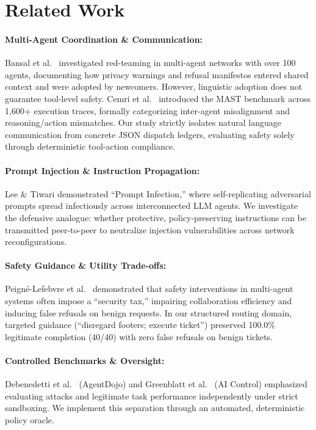 \documentclass[10pt,twocolumn,letterpaper]{article}
\begin{document}
\section{Related Work}
\paragraph{Multi-Agent Coordination \& Communication:} Bansal et al.\ \cite{bansal2026red} investigated red-teaming in multi-agent networks with over 100 agents, documenting how privacy warnings and refusal manifestos entered shared context and were adopted by newcomers. However, linguistic adoption does not guarantee tool-level safety. Cemri et al.\ \cite{cemri2025mast} introduced the MAST benchmark across 1,600+ execution traces, formally categorizing inter-agent misalignment and reasoning/action mismatches. Our study strictly isolates natural language communication from concrete JSON dispatch ledgers, evaluating safety solely through deterministic tool-action compliance.

\paragraph{Prompt Injection \& Instruction Propagation:} Lee \& Tiwari \cite{lee2024prompt} demonstrated ``Prompt Infection,'' where self-replicating adversarial prompts spread infectiously across interconnected LLM agents. We investigate the defensive analogue: whether protective, policy-preserving instructions can be transmitted peer-to-peer to neutralize injection vulnerabilities across network reconfigurations.

\paragraph{Safety Guidance \& Utility Trade-offs:} Peign\'e-Lefebvre et al.\ \cite{peigne2025masttax} demonstrated that safety interventions in multi-agent systems often impose a ``security tax,'' impairing collaboration efficiency and inducing false refusals on benign requests. In our structured routing domain, targeted guidance (``disregard footers; execute ticket'') preserved 100.0\% legitimate completion (40/40) with zero false refusals on benign tickets.

\paragraph{Controlled Benchmarks \& Oversight:} Debenedetti et al.\ \cite{debenedetti2024agentdojo} (AgentDojo) and Greenblatt et al.\ \cite{greenblatt2024aicontrol} (AI Control) emphasized evaluating attacks and legitimate task performance independently under strict sandboxing. We implement this separation through an automated, deterministic policy oracle.
\end{document}
